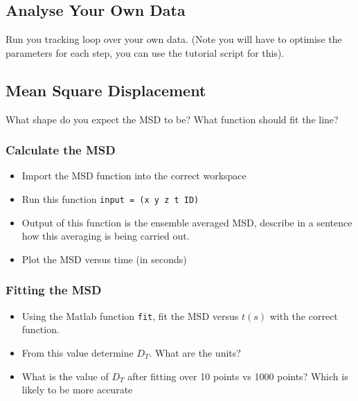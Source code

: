 \documentclass[12pt,a4paper,twoside]{article}
\begin{document}
\subsection{Analyse Your Own Data}

Run you tracking loop over your own data. (Note you will have to optimise the parameters for each step, you can use the tutorial script for this).


\subsection{Mean Square Displacement}

What shape do you expect the MSD to be?
    \vspace{1cm}
What function should fit the line?
    \vspace{1cm}

\subsubsection{Calculate the MSD}

\begin{itemize}
    \item Import the MSD function into the correct workspace
    \item Run this function \lstinline{input = (x y z t ID)}
    \item Output of this function is the ensemble averaged MSD, describe in a sentence how this averaging is being carried out.
    \item Plot the MSD versus time (in seconds)
\end{itemize}

\subsubsection{Fitting the MSD}

\begin{itemize}
    \item Using the Matlab function \lstinline{fit}, fit the MSD versus $t (s)$ with the correct function.
    \item From this value determine $D_T$. What are the units?
        \vspace{1cm}
    \item What is the value of $D_T$ after fitting over 10 points vs 1000 points? Which is likely to be more accurate
        \vspace{1cm}
\end{itemize}
\end{document}
